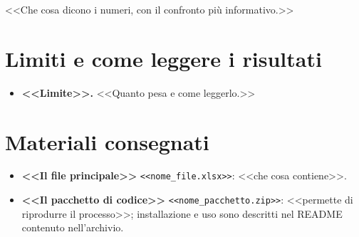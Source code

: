 <<Che cosa dicono i numeri, con il confronto più informativo.>>

\FloatBarrier

\section{Limiti e come leggere i risultati}

\begin{itemize}
\item \textbf{<<Limite>>.} <<Quanto pesa e come leggerlo.>>
\end{itemize}

\FloatBarrier

\section{Materiali consegnati}

\begin{itemize}
\item \textbf{<<Il file principale>>} \texttt{<<nome\_file.xlsx>>}: <<che cosa contiene>>.
\item \textbf{<<Il pacchetto di codice>>} \texttt{<<nome\_pacchetto.zip>>}: <<permette di riprodurre il processo>>; installazione e uso sono descritti nel README contenuto nell'archivio.
\end{itemize}

\FloatBarrier

%
%
%
%


